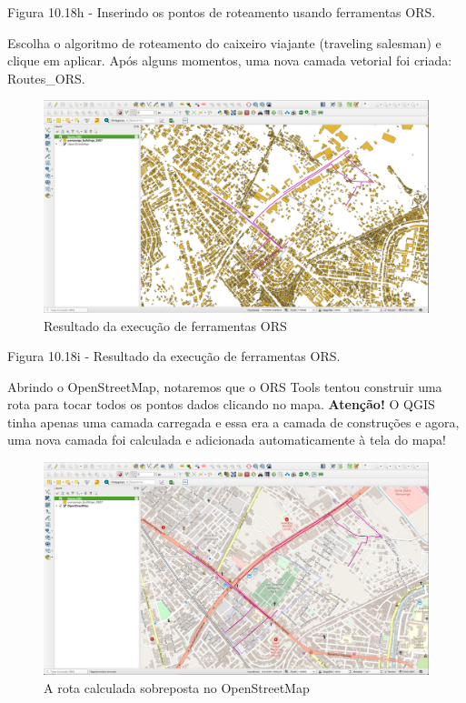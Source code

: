\documentclass[
]{krantz}
\begin{document}
Figura 10.18h - Inserindo os pontos de roteamento usando ferramentas ORS.

Escolha o algoritmo de roteamento do caixeiro viajante (traveling salesman) e clique em aplicar. Após alguns momentos, uma nova camada vetorial foi criada: Routes\_ORS.

\begin{figure}
\centering
\includegraphics{media/modulo10/fig1018_i.png}
\caption{Resultado da execução de ferramentas ORS}
\end{figure}

Figura 10.18i - Resultado da execução de ferramentas ORS.

Abrindo o OpenStreetMap, notaremos que o ORS Tools tentou construir uma rota para tocar todos os pontos dados clicando no mapa. \textbf{Atenção!} O QGIS tinha apenas uma camada carregada e essa era a camada de construções e agora, uma nova camada foi calculada e adicionada automaticamente à tela do mapa!

\begin{figure}
\centering
\includegraphics{media/modulo10/fig1018_j.png}
\caption{A rota calculada sobreposta no OpenStreetMap}
\end{figure}
\end{document}
